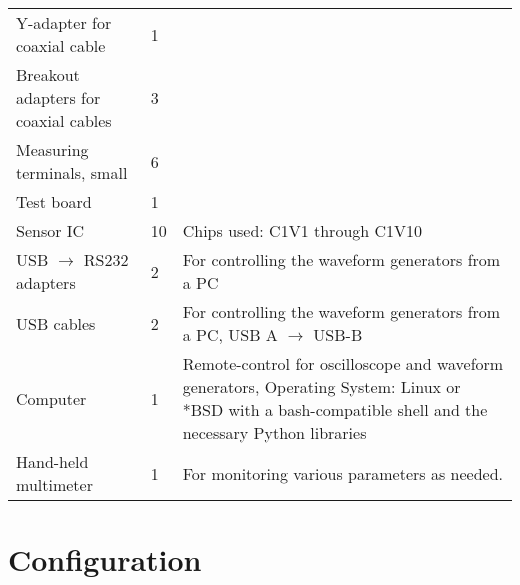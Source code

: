 \begin{centering}
\begin{xtabular}{
    >{\small}p{50mm}
    >{\small}p{8mm}
    >{\small}p{65mm}
}
    Y-adapter for coaxial cable &
    1                           &
    \\

    Breakout adapters for coaxial cables &
    3                                    &
    \\

    Measuring terminals, small &
    6                          &
    \\

    Test board &
    1          &
    \\

    Sensor IC                       &
    10                              &
    Chips used: C1V1 through C1V10  \\

    USB $\rightarrow$ RS232 adapters                  &
    2                                                 &
    For controlling the waveform generators from a PC \\

    USB cables                                        &
    2                                                 &
    For controlling the waveform generators from a PC,
    USB A $\rightarrow$ USB-B                         \\

    Computer                                                  &
    1                                                         &
    Remote-control for oscilloscope and waveform generators,
    Operating System: Linux  or *BSD with  a bash-compatible
    shell and the necessary Python libraries                  \\

    Hand-held multimeter                         &
    1                                            &
    For monitoring various parameters as needed. \\

    \bottomrule
\end{xtabular}
\end{centering}

\section{Configuration}
\label{sec:hwList}

